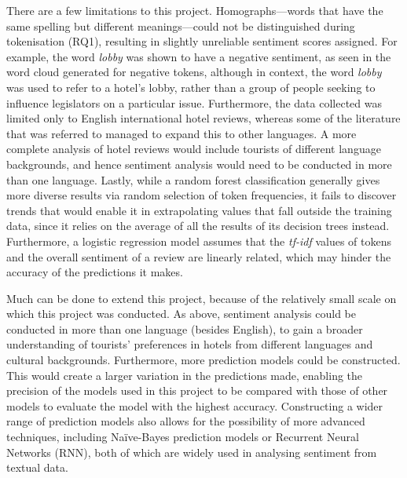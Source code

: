 \documentclass[12pt, bibliography=totocnumbered, a4paper]{scrartcl}
\def\it#1{\textit{#1}}
\begin{document}
There are a few limitations to this project. Homographs---words that have the same spelling
but different meanings---could not be distinguished during tokenisation (RQ1), resulting in
slightly unreliable sentiment scores assigned. For example, the word \it{lobby} was shown to
have a negative sentiment, as seen in the word cloud generated for negative tokens, although
in context, the word \it{lobby} was used to refer to a hotel's lobby, rather than a group of
people seeking to influence legislators on a particular issue. Furthermore, the data collected
was limited only to English international hotel reviews, whereas some of the literature that was
referred to managed to expand this to other languages. A more complete analysis of hotel reviews
would include tourists of different language backgrounds, and hence sentiment analysis would need
to be conducted in more than one language. Lastly, while a random forest classification generally
gives more diverse results via random selection of token frequencies, it fails to discover trends
that would enable it in extrapolating values that fall outside the training data,
since it relies on the average of all the results of its decision trees instead. Furthermore,
a logistic regression model assumes that the \it{tf-idf} values of tokens and the overall sentiment
of a review are linearly related, which may hinder the accuracy of the predictions it makes.

Much can be done to extend this project, because of the relatively small scale on which this project
was conducted. As above, sentiment analysis could be conducted in more than one language (besides English),
to gain a broader understanding of tourists' preferences in hotels from different languages and cultural
backgrounds. Furthermore, more prediction models could be constructed. This would create a larger
variation in the predictions made, enabling the precision of the models used in this project to be
compared with those of other models to evaluate the model with the highest accuracy. Constructing a
wider range of prediction models also allows for the possibility of more advanced techniques,
including Naïve-Bayes prediction models or Recurrent Neural Networks (RNN), both of which are
widely used in analysing sentiment from textual data.

\printbibliography
\end{document}
